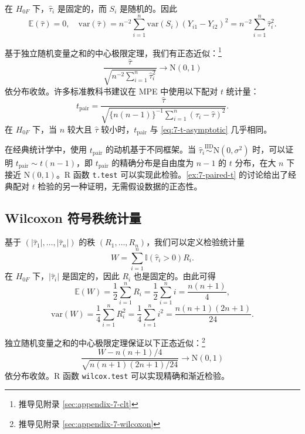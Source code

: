 \begin{Example}[配对 $t$ 统计量]\label{ex:7-paired-t}
在 $H_{0F}$ 下，$\hat\tau_i$ 是固定的，而 $S_i$ 是随机的。因此
\[
\mathbb{E}(\hat\tau) = 0, \quad
\text{var}(\hat\tau) = n^{-2} \sum_{i=1}^n \text{var}(S_i)(Y_{i1} - Y_{i2})^2 = n^{-2} \sum_{i=1}^n \hat\tau_i^2.
\]

基于独立随机变量之和的中心极限定理，我们有正态近似：\footnote{推导见附录 \cref{sec:appendix-7-clt}}
\begin{equation}
\frac{\hat\tau}{\sqrt{n^{-2} \sum_{i=1}^n \hat\tau_i^2}} \to \mathrm{N}(0, 1)
\label{eq:7-t-asymptotic}
\end{equation}
依分布收敛。许多标准教科书建议在 MPE 中使用以下配对 $t$ 统计量：
\begin{equation}
t_{\text{pair}} = \frac{\hat\tau}{\sqrt{\{n(n-1)\}^{-1} \sum_{i=1}^n (\hat\tau_i - \hat\tau)^2}}.
\label{eq:7-t-pair}
\end{equation}
在 $H_{0F}$ 下，当 $n$ 较大且 $\hat\tau$ 较小时，$t_{\text{pair}}$ 与 \cref{eq:7-t-asymptotic} 几乎相同。

在经典统计学中，使用 $t_{\text{pair}}$ 的动机基于不同框架。当 $\hat\tau_i \stackrel{\text{IID}}{\sim} \mathrm{N}(0, \sigma^2)$ 时，可以证明 $t_{\text{pair}} \sim t(n-1)$，即 $t_{\text{pair}}$ 的精确分布是自由度为 $n-1$ 的 $t$ 分布，在大 $n$ 下接近 $\mathrm{N}(0, 1)$。R 函数 \texttt{t.test} 可以实现此检验。\cref{ex:7-paired-t} 的讨论给出了经典配对 $t$ 检验的另一种证明，无需假设数据的正态性。
\end{Example}

\subsection{Wilcoxon 符号秩统计量}\label{sec:7-wilcoxon}

\begin{Example}\label{ex:7-wilcoxon}
基于 $(|\hat\tau_1|, \dots, |\hat\tau_n|)$ 的秩 $(R_1, \ldots, R_n)$，我们可以定义检验统计量
\begin{equation}
W = \sum_{i=1}^n \mathbb{I}(\hat\tau_i > 0) R_i.
\label{eq:7-wilcoxon}
\end{equation}
在 $H_{0F}$ 下，$|\hat\tau_i|$ 是固定的，因此 $R_i$ 也是固定的。由此可得
\[
\mathbb{E}(W) = \frac{1}{2} \sum_{i=1}^n R_i = \frac{1}{2} \sum_{i=1}^n i = \frac{n(n+1)}{4},
\]
\[
\text{var}(W) = \frac{1}{4} \sum_{i=1}^n R_i^2 = \frac{1}{4} \sum_{i=1}^n i^2 = \frac{n(n+1)(2n+1)}{24}.
\]

独立随机变量之和的中心极限定理保证以下正态近似：\footnote{推导见附录 \cref{sec:appendix-7-wilcoxon}}
\begin{equation}
\frac{W - n(n+1)/4}{\sqrt{n(n+1)(2n+1)/24}} \to \mathrm{N}(0, 1)
\label{eq:7-wilcoxon-asymptotic}
\end{equation}
依分布收敛。R 函数 \texttt{wilcox.test} 可以实现精确和渐近检验。
\end{Example}

